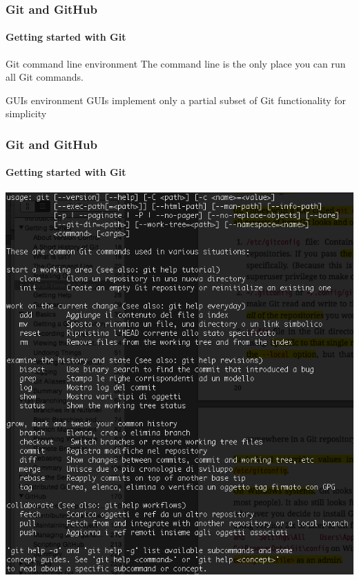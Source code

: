 \begin{frame}
    \frametitle{Git and GitHub}
    \framesubtitle{Getting started with Git}
    \addtocounter{nframe}{1}
    
	\begin{block}{Git command line environment}
		The command line is the only place you can run all Git commands.
    \end{block}

	\begin{block}{GUIs environment}
		GUIs implement only a partial subset of Git functionality for simplicity
    \end{block}
	
\end{frame}

\begin{frame}
	\frametitle{Git and GitHub}
    \framesubtitle{Getting started with Git}
    \addtocounter{nframe}{1}

	\begin{center}
		\includegraphics[width=.8\textwidth]{imgs/git-commands.png}
	\end{center}

\end{frame}

